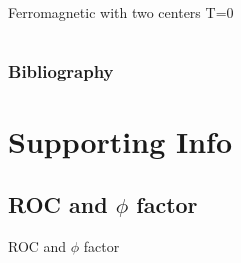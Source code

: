 \documentclass{beamer}
\begin{document}
\begin{frame}{Ferromagnetic with two centers T=0}
\begin{columns}
\begin{column}{0.5\textwidth}
\begin{center}
     \end{center}
\end{column}
\end{columns}
\end{frame}




\begin{frame}[t,allowframebreaks]
\frametitle{Bibliography}
\printbibliography
\end{frame}


\section{Supporting Info}

\subsection{ROC and $\phi$ factor}
\begin{frame}{}
\begin{center}
{\Huge ROC and $\phi$ factor}
\end{center}
\end{frame}
\end{document}
